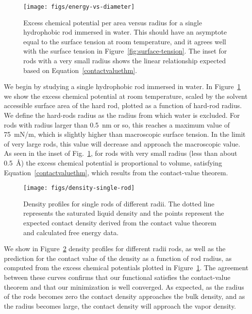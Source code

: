\documentclass[twocolumn,amsmath,amssymb,prb]{revtex4-1}
\begin{document}
\begin{figure}
\begin{center}
\texttt{[image: figs/energy-vs-diameter]}
\end{center}
\caption{ Excess chemical potential per area versus radius for a single
hydrophobic rod immersed in water. This should have an asymptote equal
to the surface tension at room temperature, and it agrees well with
the surface tension in Figure~\ref{fig:surface-tension}. The inset for
rods with a very small radius shows the linear relationship expected based on
Equation~\ref{contactvaluethm}.}
\label{fig:energy-vs-diameter}
\end{figure}

We begin by studying a single hydrophobic rod immersed in water.
In Figure~\ref{fig:energy-vs-diameter} we show the excess chemical
potential at room temperature, scaled by the solvent accessible
surface area of the hard rod, plotted as a function of hard-rod
radius.  We define the hard-rods radius as the radius from which water
is excluded.  For rods with radius larger than 0.5~nm or so, this
reaches a maximum value of 75~mN/m, which is slightly higher than
macroscopic surface tension.  In the limit of very large rods, this
value will decrease and approach the macroscopic value.  As seen in
the inset of Fig.~\ref{fig:energy-vs-diameter}, for rods with very
small radius (less than about 0.5~\AA) the excess chemical potential
is proportional to volume, satisfying Equation~\ref{contactvaluethm},
which results from the contact-value theorem.

\begin{figure}
\begin{center}
\texttt{[image: figs/density-single-rod]}
\end{center}
\caption{ Density profiles for single rods of different radii. The dotted line
represents the saturated liquid density and the points represent the
expected contact density derived from the contact value theorem and
calculated free energy data.}
\label{fig:density-single-rod}
\end{figure}

We show in Figure~\ref{fig:density-single-rod} density profiles for
different radii rods, as well as the prediction for the contact value
of the density as a function of rod radius, as computed from the
excess chemical potentials plotted in
Figure~\ref{fig:energy-vs-diameter}.  The agreement between these
curves confirms that our functional satisfies the contact-value
theorem and that our minimization is well converged.  As expected, as
the radius of the rods becomes zero the contact density approaches the
bulk density, and as the radius becomes large, the contact density
will approach the vapor density.
\end{document}
